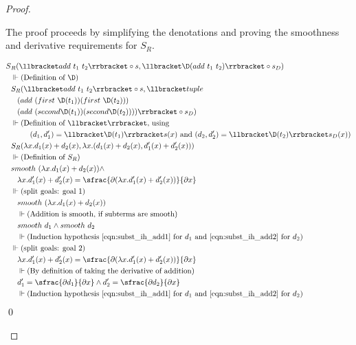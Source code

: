 \begin{proof}
\begin{enumerate}
      The proof proceeds by simplifying the denotations and proving the smoothness and derivative requirements for $S_R$.

      \begin{align*}
        S&_R(\llbracket add\ t_1\ t_2 \rrbracket \circ s, \llbracket \D(add\ t_1\ t_2) \rrbracket \circ s_D) \\
        &\Vdash \text{(Definition of $\D$)}\\
        &S_R(\llbracket add\ t_1\ t_2 \rrbracket \circ s, \llbracket tuple\ \\
        & \;\;\;(add\ (first\ \D(t_1)) (first\ \D(t_2)))\ \\
        & \;\;\;(add\ (second \D(t_1)) (second \D(t_2)))) \rrbracket \circ s_D) \\
        &\Vdash \text{(Definition of $\llbracket\rrbracket$, using} \\
        & \;\;\;\;\;\;\;\;\; \text{$(d_1, d_1') = \llbracket \D(t_1) \rrbracket s(x)$ and $(d_2, d_2') = \llbracket \D(t_2) \rrbracket s_D(x)$)}\\
        &S_R(\lambda x. d_1(x) + d_2(x), \lambda x. (d_1(x) + d_2(x), d_1'(x) + d_2'(x))) \\
        &\Vdash \text{(Definition of $S_R$)}\\
        & smooth\ (\lambda x. d_1(x) + d_2(x)) \wedge \\
        & \;\;\; \lambda x. d_1'(x) + d_2'(x) = \sfrac{\partial{(\lambda x. d_1'(x) + d_2'(x))}}{\partial{x}} \\
        &\Vdash \text{(split goals: goal 1)}\\
        &\;\;\;smooth\ (\lambda x. d_1(x) + d_2(x)) \\
        &\;\;\;\Vdash
          \text{(Addition is smooth, if subterms are smooth)}\\
        &\;\;\;smooth\ d_1 \wedge smooth\ d_2 \\
        &\;\;\;\Vdash \text{(Induction hypothesis \ref{eqn:subst_ih_add1} for $d_1$ and \ref{eqn:subst_ih_add2} for $d_2$)}\\
        &\Vdash \text{(split goals: goal 2)}\\
        &\;\;\;\lambda x. d_1'(x) + d_2'(x) = \sfrac{\partial{(\lambda x. d_1'(x) + d_2'(x))}}{\partial{x}} \\
        &\;\;\;\Vdash \text{(By definition of taking the derivative of addition)} \\
        &\;\;\; d_1' = \sfrac{\partial{d_1}}{\partial{x}} \wedge d_2' = \sfrac{\partial{d_2}}{\partial{x}} \\
        &\;\;\;\Vdash \text{(Induction hypothesis \ref{eqn:subst_ih_add1} for $d_1$ and \ref{eqn:subst_ih_add2} for $d_2$)}\\
      \end{align*} \qed


\end{enumerate}
\end{proof}
